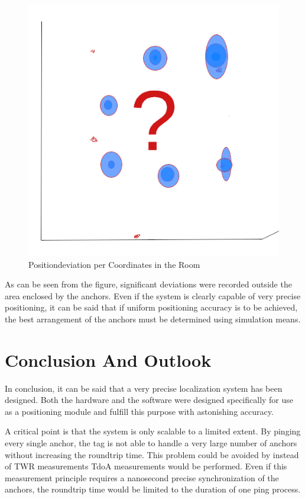 \documentclass[10pt,a4paper,twocolumn]{article}
\begin{document}
\begin{figure}[H]
  \includegraphics[scale=0.35]{images/position_plot.png}
  \caption{Positiondeviation per Coordinates in the Room}
\end{figure}

As can be seen from the figure, significant deviations were recorded outside the area enclosed by the anchors.
Even if the system is clearly capable of very precise positioning, it can be said that if uniform positioning accuracy is to be achieved,
the best arrangement of the anchors must be determined using simulation means.


\section{Conclusion And Outlook}\label{section:conclusion}
In conclusion, it can be said that a very precise localization system has been designed.
Both the hardware and the software were designed specifically for use as a positioning module and fulfill this purpose with astonishing accuracy.

A critical point is that the system is only scalable to a limited extent.
By pinging every single anchor, the tag is not able to handle a very large number of anchors without increasing the roundtrip time.
This problem could be avoided by instead of \ac{TWR} measurements \ac{TdoA} measurements would be performed.
Even if this measurement principle requires a nanosecond precise synchronization of the anchors,
the roundtrip time would be limited to the duration of one ping process.
\end{document}
